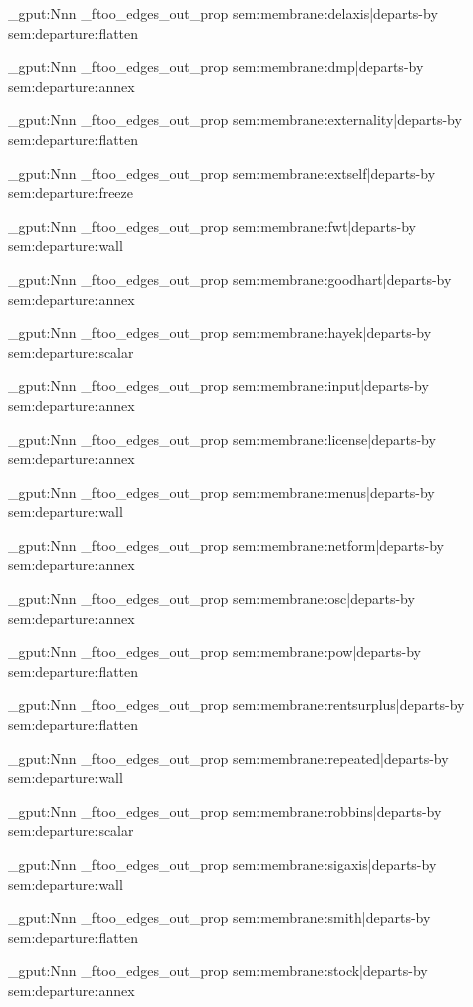 \prop_gput:Nnn \g_ftoo_edges_out_prop { sem:membrane:delaxis|departs-by } { sem:departure:flatten }

\prop_gput:Nnn \g_ftoo_edges_out_prop { sem:membrane:dmp|departs-by } { sem:departure:annex }

\prop_gput:Nnn \g_ftoo_edges_out_prop { sem:membrane:externality|departs-by } { sem:departure:flatten }

\prop_gput:Nnn \g_ftoo_edges_out_prop { sem:membrane:extself|departs-by } { sem:departure:freeze }

\prop_gput:Nnn \g_ftoo_edges_out_prop { sem:membrane:fwt|departs-by } { sem:departure:wall }

\prop_gput:Nnn \g_ftoo_edges_out_prop { sem:membrane:goodhart|departs-by } { sem:departure:annex }

\prop_gput:Nnn \g_ftoo_edges_out_prop { sem:membrane:hayek|departs-by } { sem:departure:scalar }

\prop_gput:Nnn \g_ftoo_edges_out_prop { sem:membrane:input|departs-by } { sem:departure:annex }

\prop_gput:Nnn \g_ftoo_edges_out_prop { sem:membrane:license|departs-by } { sem:departure:annex }

\prop_gput:Nnn \g_ftoo_edges_out_prop { sem:membrane:menus|departs-by } { sem:departure:wall }

\prop_gput:Nnn \g_ftoo_edges_out_prop { sem:membrane:netform|departs-by } { sem:departure:annex }

\prop_gput:Nnn \g_ftoo_edges_out_prop { sem:membrane:osc|departs-by } { sem:departure:annex }

\prop_gput:Nnn \g_ftoo_edges_out_prop { sem:membrane:pow|departs-by } { sem:departure:flatten }

\prop_gput:Nnn \g_ftoo_edges_out_prop { sem:membrane:rentsurplus|departs-by } { sem:departure:flatten }

\prop_gput:Nnn \g_ftoo_edges_out_prop { sem:membrane:repeated|departs-by } { sem:departure:wall }

\prop_gput:Nnn \g_ftoo_edges_out_prop { sem:membrane:robbins|departs-by } { sem:departure:scalar }

\prop_gput:Nnn \g_ftoo_edges_out_prop { sem:membrane:sigaxis|departs-by } { sem:departure:wall }

\prop_gput:Nnn \g_ftoo_edges_out_prop { sem:membrane:smith|departs-by } { sem:departure:flatten }

\prop_gput:Nnn \g_ftoo_edges_out_prop { sem:membrane:stock|departs-by } { sem:departure:annex }

